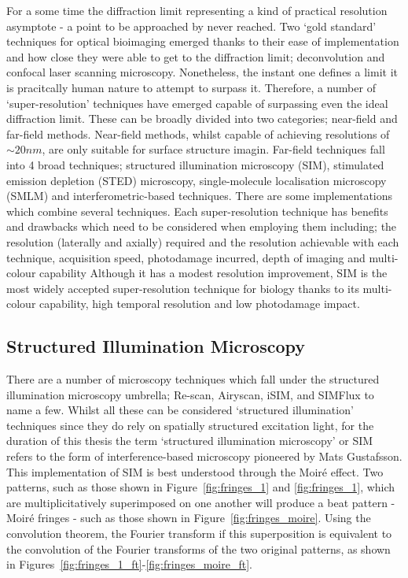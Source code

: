For a some time the diffraction limit representing a kind of practical 
resolution asymptote - a point to be approached by never reached. Two
`gold standard' techniques for optical bioimaging emerged thanks to their
ease of implementation and how close they were able to get to the diffraction
limit; deconvolution\cite{agard1983three, wallace2001workingperson} and
confocal laser scanning microscopy\cite{sheppard1981theory,minsky1988memoir}. 
Nonetheless, the instant one defines a limit it is pracitcally human nature 
to attempt to surpass it. Therefore, a number of `super-resolution' techniques
have emerged capable of surpassing even the ideal diffraction limit. These
can be broadly divided into two categories; near-field and far-field methods.
Near-field methods, whilst capable of achieving resolutions of $\sim 20 nm$,
are only suitable for surface structure imagin\cite{schermelleh2010guide}. 
Far-field techniques fall into 4 broad techniques; structured illumination
microscopy (SIM), stimulated emission depletion (STED) microscopy, 
single-molecule localisation microscopy (SMLM) and interferometric-based 
techniques. There are some implementations which combine several 
techniques. Each super-resolution technique has benefits and drawbacks which 
need to be considered when employing them including; the resolution 
(laterally and axially) required and the resolution achievable with each 
technique, acquisition speed, photodamage incurred, depth of imaging and 
multi-colour capability\cite{hell20152015,schermelleh2019super} Although it 
has a modest resolution improvement, SIM is the most widely accepted 
super-resolution technique for biology thanks to its multi-colour capability,
high temporal resolution and low photodamage impact\cite{leung2011review}.

\subsection{Structured Illumination Microscopy}
\label{subsec:SIM}

There are a number of microscopy techniques which fall under the structured
illumination microscopy umbrella; Re-scan\cite{de2013re}, 
Airyscan\cite{huff2015airyscan}, iSIM\cite{york2013instant,curd2015construction},
and SIMFlux\cite{cnossen2020localization} to name a few. Whilst all these can be 
considered `structured illumination' techniques since they do rely on spatially 
structured excitation light, for the duration of this thesis the term 
`structured illumination microscopy' or SIM refers to the form of 
interference-based microscopy pioneered by Mats 
Gustafsson\cite{gustafsson1999extended,gustafsson2000surpassing,gustafsson2008three}.
This implementation of SIM is best understood through the Moir\'{e} effect.
Two patterns, such as those shown in Figure~\ref{fig:fringes_1} and 
\ref{fig:fringes_1}, which are multiplicitatively superimposed on one another
will produce a beat pattern - Moir\'{e} fringes - such as those shown in
Figure~\ref{fig:fringes_moire}. Using the convolution theorem, the Fourier
transform if this superposition is equivalent to the convolution of the 
Fourier transforms of the two original patterns\cite{mcgillem1991continuous},
as shown in Figures~\ref{fig:fringes_1_ft}-\ref{fig:fringes_moire_ft}. 

